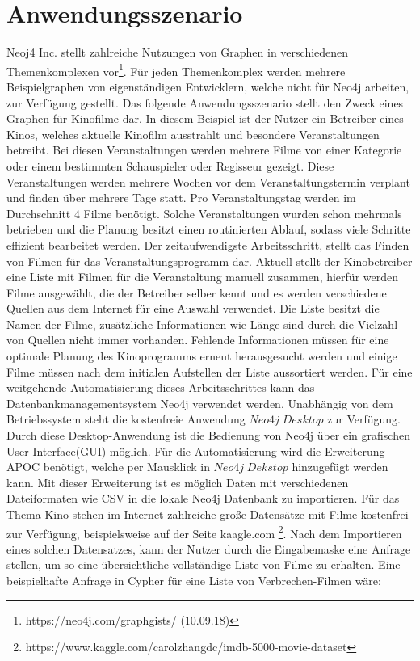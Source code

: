 \section{Anwendungsszenario}
Neoj4 Inc. stellt zahlreiche Nutzungen von Graphen in verschiedenen Themenkomplexen vor\footnote{https://neo4j.com/graphgists/ (10.09.18)}. Für jeden Themenkomplex werden mehrere Beispielgraphen von eigenständigen Entwicklern, welche nicht für Neo4j arbeiten, zur Verfügung gestellt. Das folgende Anwendungsszenario stellt den Zweck eines Graphen für Kinofilme dar.\newline
In diesem Beispiel ist der Nutzer ein Betreiber eines Kinos, welches aktuelle Kinofilm ausstrahlt und besondere Veranstaltungen betreibt. Bei diesen Veranstaltungen werden mehrere Filme von einer Kategorie oder einem bestimmten Schauspieler oder Regisseur gezeigt. Diese Veranstaltungen werden mehrere Wochen vor dem Veranstaltungstermin verplant und finden über mehrere Tage statt. Pro Veranstaltungstag werden im Durchschnitt 4 Filme benötigt. Solche Veranstaltungen wurden schon mehrmals betrieben und die Planung besitzt einen routinierten Ablauf, sodass viele Schritte effizient bearbeitet werden. Der zeitaufwendigste Arbeitsschritt, stellt das Finden von Filmen für das Veranstaltungsprogramm dar. \newline
Aktuell stellt der Kinobetreiber eine Liste mit Filmen für die Veranstaltung manuell zusammen, hierfür werden Filme ausgewählt, die der Betreiber selber kennt und es werden verschiedene Quellen aus dem Internet für eine Auswahl verwendet. Die Liste besitzt die Namen der Filme, zusätzliche Informationen wie Länge sind durch die Vielzahl von Quellen nicht immer vorhanden. Fehlende Informationen müssen für eine optimale Planung des Kinoprogramms erneut herausgesucht werden und einige Filme müssen nach dem initialen Aufstellen der Liste  aussortiert werden. \newline  
Für eine weitgehende Automatisierung dieses Arbeitsschrittes kann das Datenbankmanagementsystem Neo4j verwendet werden. Unabhängig von dem Betriebssystem steht die kostenfreie Anwendung $Neo4j\; Desktop$ zur Verfügung. Durch diese Desktop-Anwendung ist die Bedienung von Neo4j über ein grafischen User Interface(GUI) möglich. Für die Automatisierung wird die Erweiterung APOC benötigt, welche per Mausklick in $Neo4j\; Dekstop$ hinzugefügt werden kann. Mit dieser Erweiterung ist es möglich Daten mit verschiedenen Dateiformaten wie CSV in die lokale Neo4j Datenbank zu importieren. Für das Thema Kino stehen im Internet zahlreiche große Datensätze mit Filme kostenfrei zur Verfügung, beispielsweise auf der Seite kaagle.com \footnote{https://www.kaggle.com/carolzhangdc/imdb-5000-movie-dataset}. Nach dem Importieren eines solchen Datensatzes, kann der Nutzer durch die Eingabemaske eine Anfrage stellen, um so eine übersichtliche vollständige Liste von Filme zu erhalten. Eine beispielhafte Anfrage in Cypher für eine Liste von Verbrechen-Filmen wäre: 
